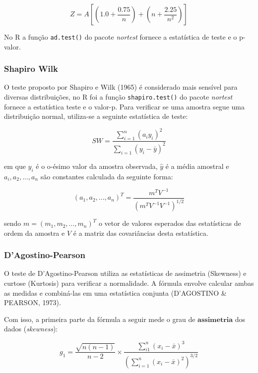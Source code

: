 \documentclass[a4paper,11pt]{article} %
\begin{document}
\begin{equation}
    Z = A \left[ \left(1.0 + \frac{0.75}{n} \right)+  \left(n+\frac{2.25}{n^{2}} \right) \right]
\end{equation}

No R a função \texttt{ad.test()} do pacote \textit{nortest} fornece a estatística de teste e o p-valor.

\subsubsection{Shapiro Wilk}

O teste proposto por Shapiro e Wilk (1965) é considerado mais sensível para diversas distribuições, no R foi a função \texttt{shapiro.test()} do pacote \textit{nortest} fornece a estatística teste e o valor-p. Para verificar se uma amostra segue uma distribuição normal, utiliza-se a seguinte estatística de teste: 

\begin{equation}
    SW = \frac{\sum_{i=1}^{n} (a_{i}y_{i})^{2}}{\sum_{i=1}  (y_{i} - \bar{y})^{2}}
\end{equation}

\noindent em que $y_{i}$ é o o-ésimo valor da amostra observada, $\hat{y}$ é a média amostral e $a_{i},a_{2},...,a_{n}$ são constantes calculada da seguinte forma:

\begin{equation}
    (a_{1},a_{2},...,a_{n})^{T} = \frac{m^{T}V^{-1}}{(m^{T}V^{-1}V^{-1} )^{1/2}}
\end{equation}

sendo $m=(m_{1},m_{2},...,m_{n})^{T}$ o vetor de valores esperados das estatísticas de ordem da amostra e $V$ é a matriz das covariâncias desta estatística.

\subsubsection{D’Agostino-Pearson}

O teste de D'Agostino-Pearson utiliza as estatísticas de assimetria (Skewness) e curtose (Kurtosis) para verificar a normalidade. A fórmula envolve calcular ambas as medidas e combiná-las em uma estatística conjunta (D'AGOSTINO \& PEARSON, 1973).

Com isso, a primeira parte da fórmula a seguir mede o grau de $\textbf{assimetria}$ dos dados (\textit{skewness}):

\begin{equation}
g_{1} = \frac{\sqrt{n(n-1)}}{n-2} \times \frac{\sum_{i1}^{n} (x_{i}-\bar{x})^{3}}{\left( \sum_{i=1}^{n} (x_{i}-\bar{x})^{2}\right)^{3/2}}
\end{equation}
\end{document}
